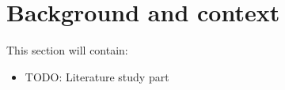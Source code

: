 \documentclass[../main.tex]{subfiles}
\begin{document}
    \section{Background and context}\label{sec:background}
    This section will contain:
    \begin{itemize}
        \item TODO: Literature study part %
    \end{itemize}
\end{document}
